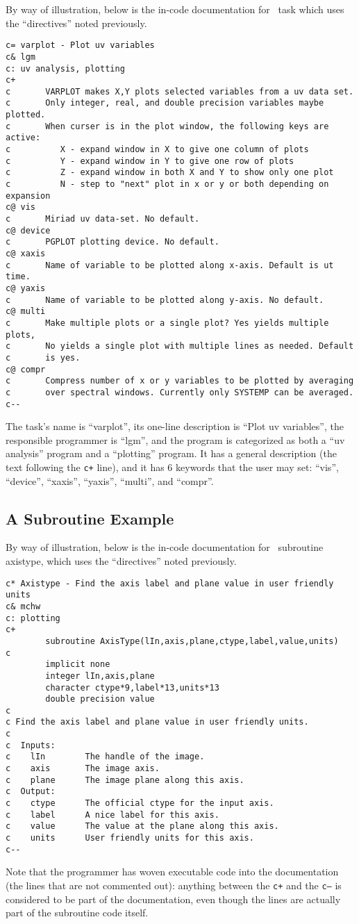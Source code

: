 By way of illustration, below is the in-code documentation for
\miriad\ task  which uses the ``directives'' noted previously.
{\small\begin{verbatim}
c= varplot - Plot uv variables
c& lgm
c: uv analysis, plotting
c+
c       VARPLOT makes X,Y plots selected variables from a uv data set.
c       Only integer, real, and double precision variables maybe plotted.
c       When curser is in the plot window, the following keys are active:
c          X - expand window in X to give one column of plots
c          Y - expand window in Y to give one row of plots
c          Z - expand window in both X and Y to show only one plot
c          N - step to "next" plot in x or y or both depending on expansion
c@ vis
c       Miriad uv data-set. No default.
c@ device
c       PGPLOT plotting device. No default.
c@ xaxis
c       Name of variable to be plotted along x-axis. Default is ut time.
c@ yaxis
c       Name of variable to be plotted along y-axis. No default.
c@ multi
c       Make multiple plots or a single plot? Yes yields multiple plots,
c       No yields a single plot with multiple lines as needed. Default
c       is yes.
c@ compr
c       Compress number of x or y variables to be plotted by averaging
c       over spectral windows. Currently only SYSTEMP can be averaged.
c--
\end{verbatim}}
The task's name is ``varplot'', its one-line description is ``Plot uv
variables'', the responsible programmer is ``lgm'', and the program is
categorized as both a ``uv analysis'' program and a ``plotting'' program.
It has a general description (the text following the {\tt c+} line), and
it has 6 keywords that the user may set:  ``vis'', ``device'',
``xaxis'', ``yaxis'', ``multi'',
and ``compr''.

\subsection*{A Subroutine Example}

By way of illustration, below is the in-code documentation for
\miriad\ subroutine axistype, which uses the ``directives'' noted previously.
{\small\begin{verbatim}
c* Axistype - Find the axis label and plane value in user friendly units
c& mchw
c: plotting
c+
        subroutine AxisType(lIn,axis,plane,ctype,label,value,units)
c
        implicit none
        integer lIn,axis,plane
        character ctype*9,label*13,units*13
        double precision value
c
c Find the axis label and plane value in user friendly units.
c
c  Inputs:
c    lIn        The handle of the image.
c    axis       The image axis.
c    plane      The image plane along this axis.
c  Output:
c    ctype      The official ctype for the input axis.
c    label      A nice label for this axis.
c    value      The value at the plane along this axis.
c    units      User friendly units for this axis.
c--
\end{verbatim}}
Note that the programmer has woven executable code into the documentation
(the lines that are not commented out):  anything between the {\tt c+} and
the {\tt c--} is considered to be part of the documentation, even though
the lines are actually part of the subroutine code itself.

